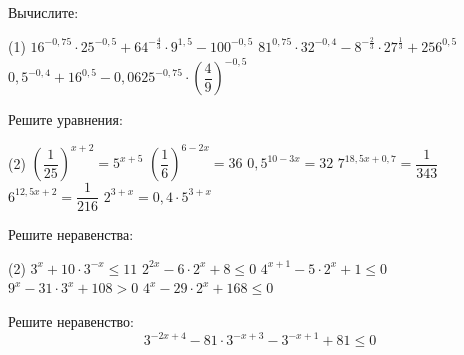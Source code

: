 \begin{class}[number=4]
	\begin{listofex}
		\item Вычислите: %
		\begin{tasks}(1)
			\task \( 16^{-0,75} \cdot 25^{-0,5} + 64^{-\tfrac{4}{3}}\cdot 9^{1,5} - 100^{-0,5} \)
			\task \( 81^{0,75} \cdot 32^{-0,4} - 8^{-\tfrac{2}{3}} \cdot 27^{\tfrac{1}{3}} + 256^{0,5} \)
			\task \( 0,5^{-0,4} + 16^{0,5}-0,0625^{-0,75} \cdot \left( \dfrac{4}{9} \right)^{-0,5}  \)
		\end{tasks}
		\item Решите уравнения: %
		\begin{tasks}(2)
			\task \( \left( \dfrac{1}{25} \right)^{x+2}=5^{x+5} \)
			\task \( \left( \dfrac{1}{6} \right)^{6-2x}=36 \)
			\task \( 0,5^{10-3x}=32 \)
			\task \( 7^{18,5x+0,7}=\dfrac{1}{343} \)
			\task \( 6^{12,5x+2}=\dfrac{1}{216} \)
			\task \( 2^{3+x}=0,4 \cdot 5^{3+x} \)
		\end{tasks}
		\item Решите неравенства: %
		\begin{tasks}(2)
			\task \( 3^x+10 \cdot 3^{-x} \le 11 \)
			\task \( 2^{2x} - 6 \cdot 2^{x} + 8 \le 0 \)
			\task \( 4^{x+1} - 5 \cdot 2^{x} + 1 \le 0 \)
			\task \( 9^x - 31 \cdot 3^x + 108 > 0 \)
			\task \( 4^x - 29 \cdot 2^x + 168 \le 0 \)
		\end{tasks}
		\item Решите неравенство: \[ 3^{-2x+4}-81 \cdot 3^{-x+3}-3^{-x+1}+81 \le 0 \]
	\end{listofex}
\end{class}

